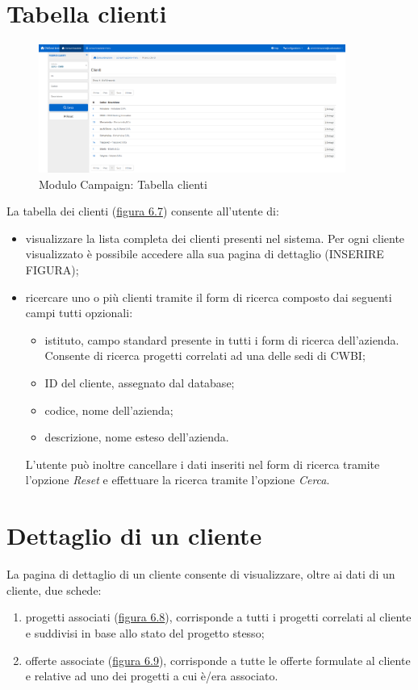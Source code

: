 \pagebreak

\section{Tabella clienti}
\begin{figure}[!h]
\centering
\includegraphics[width=380px]{../images/UI/08-tabellaClienti.png}
\caption{Modulo Campaign: Tabella clienti}
\label{fig:tabellaClienti}
\end{figure}

\noindent La tabella dei clienti ({\hyperref[fig:tabellaClienti]{figura 6.7}}) consente all'utente di:
\begin{itemize}
\item visualizzare la lista completa dei clienti presenti nel sistema. Per ogni cliente visualizzato è possibile accedere alla sua pagina di dettaglio (INSERIRE FIGURA); 
\item ricercare uno o più clienti tramite il form di ricerca composto dai seguenti campi tutti opzionali:
\begin{itemize}
\item istituto, campo standard presente in tutti i form di ricerca dell'azienda. Consente di ricerca progetti correlati ad una delle sedi di CWBI;
\item ID del cliente, assegnato dal database;
\item codice, nome dell'azienda;
\item descrizione, nome esteso dell'azienda.
\end{itemize}
L'utente può inoltre cancellare i dati inseriti nel form di ricerca tramite l'opzione \textit{Reset} e effettuare la ricerca tramite l'opzione \textit{Cerca}.
\end{itemize}

\pagebreak

\section{Dettaglio di un cliente}
\noindent La pagina di dettaglio di un cliente consente di visualizzare, oltre ai dati di un cliente, due schede:
\begin{enumerate}
\item progetti associati ({\hyperref[fig:dettaglioCliente1]{figura 6.8}}), corrisponde a tutti i progetti correlati al cliente e suddivisi in base allo stato del progetto stesso;
\item offerte associate ({\hyperref[fig:dettaglioCliente2]{figura 6.9}}), corrisponde a tutte le offerte formulate al cliente e relative ad uno dei progetti a cui è/era associato.
\end{enumerate}

